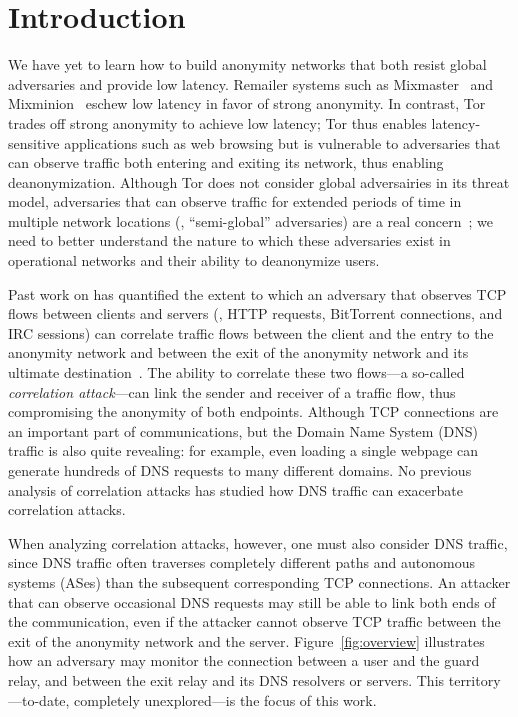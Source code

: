 \section{Introduction}
\label{sec:introduction}

We have yet to learn how to build anonymity networks that both
resist global adversaries and provide low latency.  Remailer systems
such as Mixmaster~\cite{mixmaster} and
Mixminion~\cite{danezis2003mixminion} eschew low latency in favor of
strong anonymity.
In contrast, Tor~\cite{dingledine04tor} trades off strong anonymity to
achieve low latency; Tor thus
enables latency-sensitive applications such as web browsing but is
vulnerable to
adversaries that can observe traffic both
entering and exiting its network, thus enabling deanonymization.
Although Tor does not consider global adversairies in its threat model,
adversaries that can observe traffic for extended periods of time in
multiple network locations (\ie, ``semi-global'' adversaries) are a real
concern~\cite{Farrell2014a,Johnson2013a}; we need to better understand
the nature to which these adversaries exist in operational networks and
their ability to deanonymize users.

Past work on has quantified the extent to which an adversary that
observes TCP flows between clients and servers (\eg, HTTP requests,
BitTorrent connections, and IRC sessions) can correlate traffic flows
between the client and the entry to the anonymity network and between
the exit of the anonymity network and its ultimate
destination~\cite{Johnson2013a,Murdoch2007a}. The ability to correlate
these two flows---a so-called {\em correlation attack}---can link the
sender and receiver of a traffic flow, thus compromising the anonymity
of both endpoints. Although TCP connections are an important part
of communications, but the Domain Name System (DNS) traffic is also
quite revealing: for example, even loading a single webpage can generate
hundreds of DNS requests to many different domains. No previous analysis
of correlation attacks has studied how DNS traffic can exacerbate
correlation attacks.

When analyzing correlation attacks, however, one must also consider DNS
traffic, since DNS traffic often traverses completely different paths
and autonomous systems (ASes) than the subsequent corresponding TCP
connections.  An attacker that can observe occasional DNS
requests may still be able to link both ends of the communication, even
if the attacker cannot observe TCP traffic between the exit of the
anonymity network and the server.
Figure~\ref{fig:overview} illustrates how an adversary may
monitor the connection between a user and the guard relay, and between the exit
relay and its DNS resolvers or servers.  This
territory---to-date, completely unexplored---is the focus of this work.


